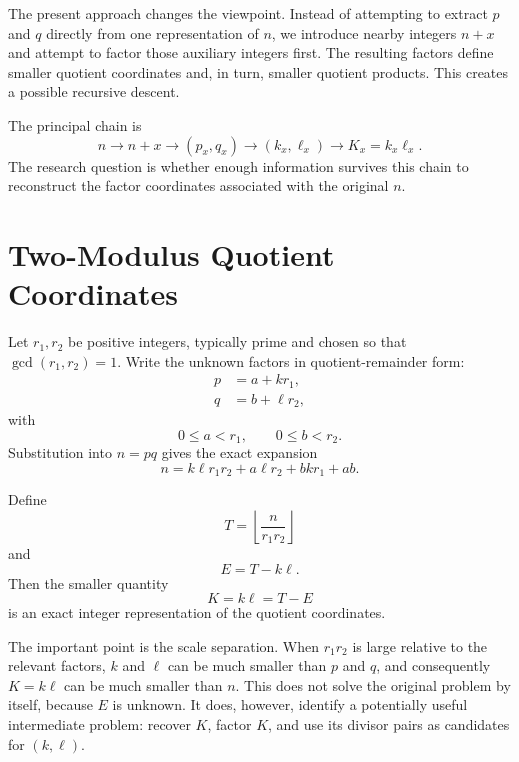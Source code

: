 \documentclass[11pt,a4paper]{article}
\begin{document}
The present approach changes the viewpoint. Instead of attempting to extract
$p$ and $q$ directly from one representation of $n$, we introduce nearby
integers $n+x$ and attempt to factor those auxiliary integers first.
The resulting factors define smaller quotient coordinates and, in turn,
smaller quotient products. This creates a possible recursive descent.

The principal chain is
\[
    n
    \longrightarrow
    n+x
    \longrightarrow
    (p_x,q_x)
    \longrightarrow
    (k_x,\ell_x)
    \longrightarrow
    K_x=k_x\ell_x.
\]
The research question is whether enough information survives this chain to
reconstruct the factor coordinates associated with the original $n$.

\section{Two-Modulus Quotient Coordinates}

Let $r_1,r_2$ be positive integers, typically prime and chosen so that
$\gcd(r_1,r_2)=1$. Write the unknown factors in quotient-remainder form:
\begin{align}
    p &= a+k r_1,\\
    q &= b+\ell r_2,
\end{align}
with
\[
    0\le a<r_1,
    \qquad
    0\le b<r_2.
\]
Substitution into $n=pq$ gives the exact expansion
\begin{equation}
\label{eq:product-expansion}
    n
    =k\ell r_1r_2
     +a\ell r_2
     +bk r_1
     +ab.
\end{equation}

Define
\begin{equation}
\label{eq:T-definition}
    T=\left\lfloor\frac{n}{r_1r_2}\right\rfloor
\end{equation}
and
\begin{equation}
\label{eq:E-definition}
    E=T-k\ell.
\end{equation}
Then the smaller quantity
\begin{equation}
\label{eq:K-definition}
    K=k\ell=T-E
\end{equation}
is an exact integer representation of the quotient coordinates.

The important point is the scale separation. When $r_1r_2$ is large relative
to the relevant factors, $k$ and $\ell$ can be much smaller than $p$ and
$q$, and consequently $K=k\ell$ can be much smaller than $n$.
This does not solve the original problem by itself, because $E$ is unknown.
It does, however, identify a potentially useful intermediate problem:
recover $K$, factor $K$, and use its divisor pairs as candidates for
$(k,\ell)$.
\end{document}

